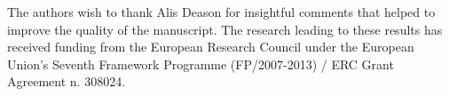 \documentclass[fleqn,usenatbib]{mnras}
\begin{document}
The authors wish to thank Alis Deason for insightful comments that
helped to improve the quality of the manuscript.  The research leading
to these results has received funding from the European Research
Council under the European Union's Seventh Framework Programme
(FP/2007-2013) / ERC Grant Agreement n. 308024.





\bsp	%
\label{lastpage}
\end{document}
